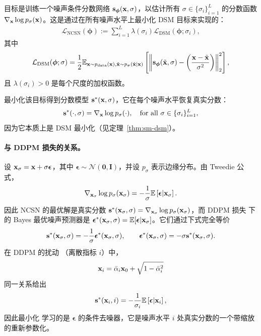 目标是训练一个噪声条件分数网络 ${\mathbf{s}}_{\bm{\phi}}({\mathbf{x}}, \sigma)$，以估计所有 $\sigma \in \{\sigma_i\}_{i=1}^L$ 的分数函数 $\nabla_{{\mathbf{x}}} \log p_\sigma({\mathbf{x}})$。这是通过在所有噪声水平上最小化 DSM 目标来实现的：
\begin{align}\label{eq:nscn}
\mathcal{L}_{\text{NCSN}}(\bm{\phi}) := \sum_{i=1}^{L} \lambda(\sigma_i)   \mathcal{L}_{\text{DSM}}(\bm{\phi}; \sigma_i),
\end{align}
其中
\begin{align*}
\mathcal{L}_{\text{DSM}}(\bm{\phi}; \sigma) 
= \frac{1}{2} \mathbb{E}_{{\mathbf{x}} \sim p_{\text{data}}({\mathbf{x}}),   \tilde{{\mathbf{x}}} \sim p_{\sigma}(\tilde{{\mathbf{x}}} | {\mathbf{x}})} 
\left[ \left\lVert{\mathbf{s}}_{\bm{\phi}}(\tilde{{\mathbf{x}}}, \sigma) - \left( \frac{{\mathbf{x}} - \tilde{{\mathbf{x}}}}{\sigma^2} \right)\right\rVert_2^2 \right],
\end{align*}
且 $\lambda(\sigma_i)>0$ 是每个尺度的加权函数。

最小化该目标得到分数模型 ${\mathbf{s}}^*({\mathbf{x}}, \sigma)$，它在每个噪声水平恢复真实分数：
\[
{\mathbf{s}}^*(\cdot, \sigma) = \nabla_{{\mathbf{x}}} \log p_\sigma(\cdot),  \quad \text{for all } \sigma \in \{\sigma_i\}_{i=1}^L,
\]
因为它本质上是 DSM 最小化（见定理~\ref{thm:sm-dsm}）。


\paragraph{与 DDPM 损失的关系。}
设 ${\mathbf{x}}_\sigma={\mathbf{x}}+\sigma\boldsymbol{\epsilon}$，其中 $\boldsymbol{\epsilon}\sim\mathcal{N}(\mathbf{0},\mathbf{I})$，并设 $p_\sigma$ 表示边缘分布。由 Tweedie 公式，
\[
\nabla_{{\mathbf{x}}_\sigma}\log p_\sigma({\mathbf{x}}_\sigma)
= -\frac{1}{\sigma} \mathbb{E} \left[\boldsymbol{\epsilon} \middle|  {\mathbf{x}}_\sigma\right].
\]
因此 NCSN 的最优解是真实分数 ${\mathbf{s}}^*({\mathbf{x}}_\sigma,\sigma)=\nabla_{{\mathbf{x}}_\sigma}\log p_\sigma({\mathbf{x}}_\sigma)$，而 DDPM 损失  下的 Bayes 最优噪声预测器是 $\boldsymbol{\epsilon}^*({\mathbf{x}}_\sigma,\sigma)=\mathbb{E}[\boldsymbol{\epsilon}|{\mathbf{x}}_\sigma]$。它们通过下式完全等价
\[
{\mathbf{s}}^*({\mathbf{x}}_\sigma,\sigma) = - \frac{1}{\sigma} \boldsymbol{\epsilon}^*({\mathbf{x}}_\sigma,\sigma),
\qquad
\boldsymbol{\epsilon}^*({\mathbf{x}}_\sigma,\sigma) = - \sigma {\mathbf{s}}^*({\mathbf{x}}_\sigma,\sigma).
\]
在 DDPM 的扰动 （离散指标 $i$）中，
\[
{\mathbf{x}}_i = \bar{\alpha}_i {\mathbf{x}}_0 + \sqrt{1 - \bar{\alpha}_i^2}
\]
同一关系给出
\[
{\mathbf{s}}^*({\mathbf{x}}_i,i)= -\frac{1}{\sigma_i} \mathbb{E} \left[\boldsymbol{\epsilon} \middle|  {\mathbf{x}}_i\right],
\]
因此最小化  学习的是 $\boldsymbol{\epsilon}$ 的条件去噪器，它是噪声水平 $i$ 处真实分数的一个带缩放的重新参数化。

